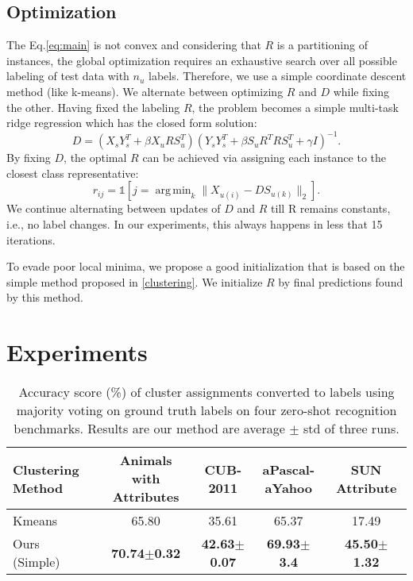 \documentclass[10pt,twocolumn,letterpaper]{article}
\DeclareMathOperator*{\argmin}{arg\,min}
\begin{document}
\subsection{Optimization} \label{optimization}
The Eq.\eqref{eq:main} is not convex and considering that $R$ is a partitioning of instances, the global optimization requires an
exhaustive search over all possible labeling of test data with $n_u$ labels. Therefore, we use a simple coordinate descent
method (like k-means). We alternate between optimizing $R$ and $D$ while fixing the other.
Having fixed the labeling $R$, the problem becomes a simple multi-task ridge regression which has the closed form solution:
\begin{equation} \label{eq:d_update}
  D = (X_s Y_s^T + \beta X_u R S_u^T) (Y_s Y_s^T + \beta S_u R^T R S_u^T  + \gamma I)^{-1}.
\end{equation}
By fixing $D$, the optimal $R$ can be achieved via assigning each instance to the closest class representative:
\begin{equation} \label{eq:r_update}
  r_{ij} = \mathds{1}[j = \argmin_{k} \lVert X_{u(i)} - D S_{u(k)} \rVert_2 ].
\end{equation}
We continue alternating between updates of $D$ and $R$ till R remains constants, i.e., no label changes. In our experiments, this always happens
in less that 15 iterations.

To evade poor local minima, we propose a good initialization that is based on the simple method proposed in \ref{clustering}. We initialize  $R$ by final predictions found by this method.
\section{Experiments} \label{experiments}
\begin{table*}[ht] \label{tab:cluster}
\begin{minipage}{\textwidth}
\centering
\caption{Accuracy score (\%) of cluster assignments converted to labels
using majority voting on ground truth labels on four zero-shot recognition benchmarks.
Results are our method are average $\pm$ std of three runs.
} \vspace{2mm}
\begin{tabular}{|l|c|c|c|c|}
\hline
Clustering Method & Animals with Attributes & CUB-2011 & aPascal-aYahoo & SUN Attribute \\
\hline
Kmeans                             &  65.80                 & 35.61           & 65.37                & 17.49    \\
\hline
Ours (Simple)                     & \textbf{70.74$\pm$0.32}  & \textbf{42.63$\pm$0.07} & \textbf{69.93$\pm$ 3.4} & \textbf{ 45.50$\pm$1.32} \\
\hline
\end{tabular}
\vspace{2mm}
\end{minipage}
\end{table*}
\end{document}
